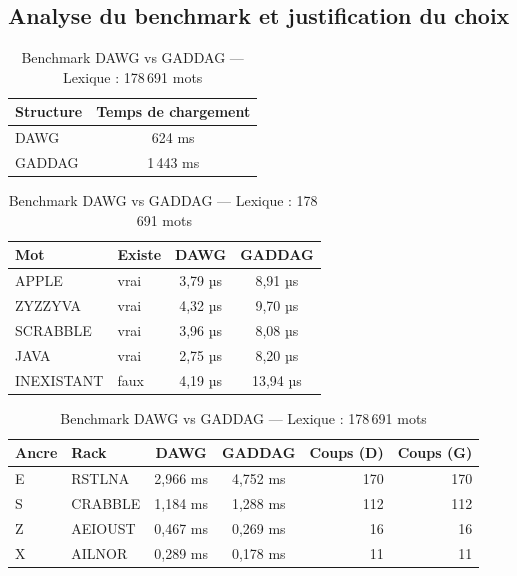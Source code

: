 \documentclass[a4paper]{article}
\begin{document}
\subsection{Analyse du benchmark et justification du choix}

\begin{table}[h!]
    \centering
    \renewcommand{\arraystretch}{1.3}
    \caption{Benchmark DAWG vs GADDAG — Lexique : 178\,691 mots}
    \vspace{0.5em}

    \begin{tabular}{@{}lc@{}}
        \toprule
        \textbf{Structure} & \textbf{Temps de chargement} \\
        \midrule
        DAWG   & 624 ms \\
        GADDAG & 1\,443 ms \\
        \bottomrule
    \end{tabular}

    \vspace{1em}

    \begin{tabular}{@{}llcc@{}}
        \toprule
        \textbf{Mot} & \textbf{Existe} & \textbf{DAWG} & \textbf{GADDAG} \\
        \midrule
        APPLE      & vrai  & 3,79 µs  & 8,91 µs  \\
        ZYZZYVA    & vrai  & 4,32 µs  & 9,70 µs  \\
        SCRABBLE   & vrai  & 3,96 µs  & 8,08 µs  \\
        JAVA       & vrai  & 2,75 µs  & 8,20 µs  \\
        INEXISTANT & faux  & 4,19 µs  & 13,94 µs \\
        \bottomrule
    \end{tabular}

    \vspace{1em}

    \begin{tabular}{@{}llccrr@{}}
        \toprule
        \textbf{Ancre} & \textbf{Rack} & \textbf{DAWG} & \textbf{GADDAG} & \textbf{Coups (D)} & \textbf{Coups (G)} \\
        \midrule
        E & RSTLNA  & 2,966 ms & 4,752 ms & 170 & 170 \\
        S & CRABBLE & 1,184 ms & 1,288 ms & 112 & 112 \\
        Z & AEIOUST & 0,467 ms & 0,269 ms &  16 &  16 \\
        X & AILNOR  & 0,289 ms & 0,178 ms &  11 &  11 \\
        \bottomrule
    \end{tabular}
\end{table}
\end{document}
